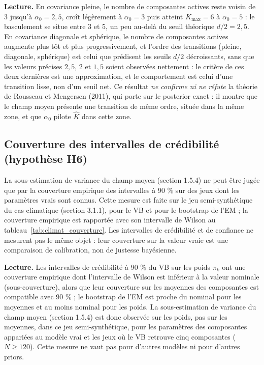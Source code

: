 
\textbf{Lecture. }En covariance pleine, le nombre de composantes actives reste voisin de 3 jusqu'à $\alpha_0 = 2{,}5$, croît légèrement à $\alpha_0 = 3$ puis atteint $K_{\max}=6$ à $\alpha_0 = 5$ : le basculement se situe entre 3 et 5, un peu au-delà du seuil théorique $d/2 = 2{,}5$. En covariance diagonale et sphérique, le nombre de composantes actives augmente plus tôt et plus progressivement, et l'ordre des transitions (pleine, diagonale, sphérique) est celui que prédisent les seuils $d/2$ décroissants, sans que les valeurs précises $2{,}5$, $2$ et $1{,}5$ soient observées nettement : le critère de ces deux dernières est une approximation, et le comportement est celui d'une transition lisse, non d'un seuil net. Ce résultat \emph{ne confirme ni ne réfute} la théorie de Rousseau et Mengersen (2011), qui porte sur le posterior exact : il montre que le champ moyen présente une transition de même ordre, située dans la même zone, et que $\alpha_0$ pilote $\hat K$ dans cette zone.

\subsection{Couverture des intervalles de crédibilité (hypothèse H6)}
La sous-estimation de variance du champ moyen (section 1.5.4) ne peut être jugée que par la couverture empirique des intervalles à 90 \% sur des jeux dont les paramètres vrais sont connus. Cette mesure est faite sur le jeu semi-synthétique du cas climatique (section 3.1.1), pour le VB et pour le bootstrap de l'EM ; la couverture empirique est rapportée avec son intervalle de Wilson au tableau~\ref{tab:climat_couverture}. Les intervalles de crédibilité et de confiance ne mesurent pas le même objet : leur couverture sur la valeur vraie est une comparaison de calibration, non de justesse bayésienne.


\textbf{Lecture. }Les intervalles de crédibilité à 90 \% du VB sur les poids $\pi_k$ ont une couverture empirique dont l'intervalle de Wilson est inférieur à la valeur nominale (sous-couverture), alors que leur couverture sur les moyennes des composantes est compatible avec 90 \% ; le bootstrap de l'EM est proche du nominal pour les moyennes et au moins nominal pour les poids. La sous-estimation de variance du champ moyen (section 1.5.4) est donc observée sur les poids, pas sur les moyennes, dans ce jeu semi-synthétique, pour les paramètres des composantes appariées au modèle vrai et les jeux où le VB retrouve cinq composantes ($N \geq 120$). Cette mesure ne vaut pas pour d'autres modèles ni pour d'autres priors.

